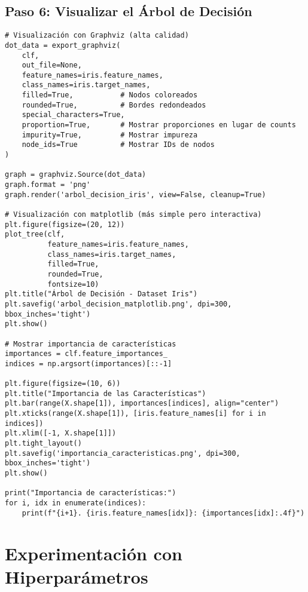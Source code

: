 \documentclass[12pt]{article}
\begin{document}
\subsection{Paso 6: Visualizar el Árbol de Decisión}
\begin{lstlisting}
# Visualización con Graphviz (alta calidad)
dot_data = export_graphviz(
    clf,
    out_file=None,
    feature_names=iris.feature_names,
    class_names=iris.target_names,
    filled=True,           # Nodos coloreados
    rounded=True,          # Bordes redondeados
    special_characters=True,
    proportion=True,       # Mostrar proporciones en lugar de counts
    impurity=True,         # Mostrar impureza
    node_ids=True          # Mostrar IDs de nodos
)

graph = graphviz.Source(dot_data)
graph.format = 'png'
graph.render('arbol_decision_iris', view=False, cleanup=True)

# Visualización con matplotlib (más simple pero interactiva)
plt.figure(figsize=(20, 12))
plot_tree(clf, 
          feature_names=iris.feature_names, 
          class_names=iris.target_names, 
          filled=True, 
          rounded=True, 
          fontsize=10)
plt.title("Árbol de Decisión - Dataset Iris")
plt.savefig('arbol_decision_matplotlib.png', dpi=300, bbox_inches='tight')
plt.show()

# Mostrar importancia de características
importances = clf.feature_importances_
indices = np.argsort(importances)[::-1]

plt.figure(figsize=(10, 6))
plt.title("Importancia de las Características")
plt.bar(range(X.shape[1]), importances[indices], align="center")
plt.xticks(range(X.shape[1]), [iris.feature_names[i] for i in indices])
plt.xlim([-1, X.shape[1]])
plt.tight_layout()
plt.savefig('importancia_caracteristicas.png', dpi=300, bbox_inches='tight')
plt.show()

print("Importancia de características:")
for i, idx in enumerate(indices):
    print(f"{i+1}. {iris.feature_names[idx]}: {importances[idx]:.4f}")
\end{lstlisting}

\section{Experimentación con Hiperparámetros}
\end{document}

